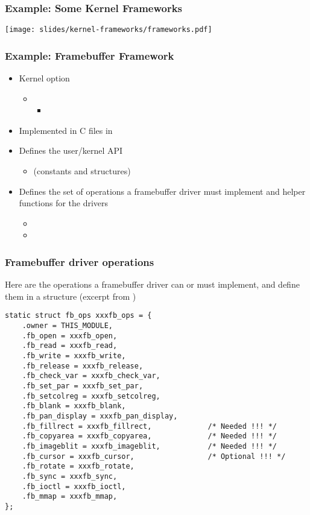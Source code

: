 \begin{frame}
  \frametitle{Example: Some Kernel Frameworks}
  \begin{center}
    \texttt{[image: slides/kernel-frameworks/frameworks.pdf]}
  \end{center}
\end{frame}

\begin{frame}
  \frametitle{Example: Framebuffer Framework}
  \begin{itemize}
  \item Kernel option 
    \begin{itemize}
    \item {}
      \begin{itemize}
      \item {}
      \end{itemize}
    \end{itemize}
  \item Implemented in C files in 
  \item Defines the user/kernel API
    \begin{itemize}
    \item {} (constants and structures)
    \end{itemize}
  \item Defines the set of operations a framebuffer driver must
    implement and helper functions for the drivers
    \begin{itemize}
    \item {}
    \item {}
    \end{itemize}
  \end{itemize}
\end{frame}

\begin{frame}[fragile]
  \frametitle{Framebuffer driver operations}
  \small Here are the operations a framebuffer driver can or must
  implement, and define them in a  structure
  (excerpt from )
  \footnotesize
  \begin{verbatim}
static struct fb_ops xxxfb_ops = {
    .owner = THIS_MODULE,
    .fb_open = xxxfb_open,
    .fb_read = xxxfb_read,
    .fb_write = xxxfb_write,
    .fb_release = xxxfb_release,
    .fb_check_var = xxxfb_check_var,
    .fb_set_par = xxxfb_set_par,
    .fb_setcolreg = xxxfb_setcolreg,
    .fb_blank = xxxfb_blank,
    .fb_pan_display = xxxfb_pan_display,
    .fb_fillrect = xxxfb_fillrect,             /* Needed !!! */
    .fb_copyarea = xxxfb_copyarea,             /* Needed !!! */
    .fb_imageblit = xxxfb_imageblit,           /* Needed !!! */
    .fb_cursor = xxxfb_cursor,                 /* Optional !!! */
    .fb_rotate = xxxfb_rotate,
    .fb_sync = xxxfb_sync,
    .fb_ioctl = xxxfb_ioctl,
    .fb_mmap = xxxfb_mmap,
};
  \end{verbatim}
\end{frame}

